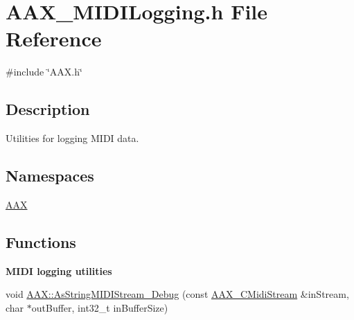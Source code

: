 \hypertarget{a00737}{}\section{A\+A\+X\+\_\+\+M\+I\+D\+I\+Logging.\+h File Reference}
\label{a00737}
{\ttfamily \#include \char`\"{}A\+A\+X.\+h\char`\"{}}\newline


\subsection{Description}
Utilities for logging M\+I\+DI data. 

\subsection*{Namespaces}
\begin{DoxyCompactItemize}
\item 
 \mbox{\hyperlink{a00852}{A\+AX}}
\end{DoxyCompactItemize}
\subsection*{Functions}
\begin{Indent}\textbf{ M\+I\+DI logging utilities}\par
\begin{DoxyCompactItemize}
\item 
void \mbox{\hyperlink{a00840_ga5b2751acd531f46a0e4dd68cd0863f46}{A\+A\+X\+::\+As\+String\+M\+I\+D\+I\+Stream\+\_\+\+Debug}} (const \mbox{\hyperlink{a01433}{A\+A\+X\+\_\+\+C\+Midi\+Stream}} \&in\+Stream, char $\ast$out\+Buffer, int32\+\_\+t in\+Buffer\+Size)
\end{DoxyCompactItemize}
\end{Indent}
